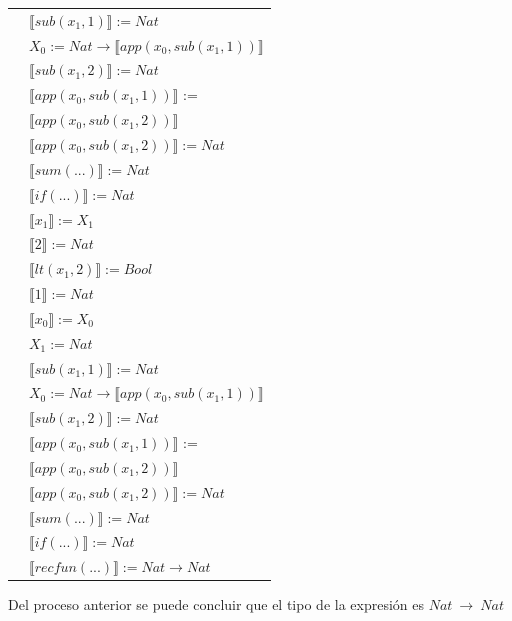 \begin{exercise}
\begin{description}
\begin{center}
\begin{longtable}[!h]{ | l | l | }
			     & $ \llbracket sub(x_1,1) \rrbracket := Nat$\\
			     & $X_0 := Nat \to  \llbracket app(x_0, sub(x_1,1)) \rrbracket$\\
			     & $ \llbracket sub(x_1,2) \rrbracket := Nat$ \\
			     & $ \llbracket app(x_0, sub(x_1,1)) \rrbracket$ := \\
			     & $ \llbracket app(x_0, sub(x_1,2)) \rrbracket$\\ 
			     & $ \llbracket app(x_0, sub(x_1,2)) \rrbracket := Nat$ \\
			     & $ \llbracket sum(...) \rrbracket := Nat$ \\
			     & $ \llbracket if(...) \rrbracket := Nat$  \\
                     \hline 
			     & $ \llbracket x_1 \rrbracket := X_1$\\
                        & $ \llbracket 2 \rrbracket := Nat$\\ 
                        & $ \llbracket lt(x_1 , 2) \rrbracket := Bool$\\  
			     & $ \llbracket 1 \rrbracket := Nat$\\
			     & $ \llbracket x_0 \rrbracket := X_0$\\
			     & $X_1 := Nat$\\
			     &  $ \llbracket sub(x_1,1) \rrbracket := Nat$\\
			     &  $X_0 := Nat \to  \llbracket app(x_0, sub(x_1,1)) \rrbracket$\\
			     & $ \llbracket sub(x_1,2) \rrbracket := Nat$ \\
			     & $ \llbracket app(x_0, sub(x_1,1)) \rrbracket$ := \\
			     & $ \llbracket app(x_0, sub(x_1,2)) \rrbracket$\\ 
			     & $ \llbracket app(x_0, sub(x_1,2)) \rrbracket := Nat$ \\
			     & $ \llbracket sum(...) \rrbracket := Nat$ \\
			     & $ \llbracket if(...) \rrbracket := Nat$  \\
                      	     & $ \llbracket recfun(...) \rrbracket :=   Nat  \to  Nat $\\ 
                    \hline
                \end{longtable}
            \end{center}
            Del proceso anterior se puede concluir que el tipo de la expresión es $Nat \ \to \ Nat$
        \end{description}
    \end{exercise}
    
